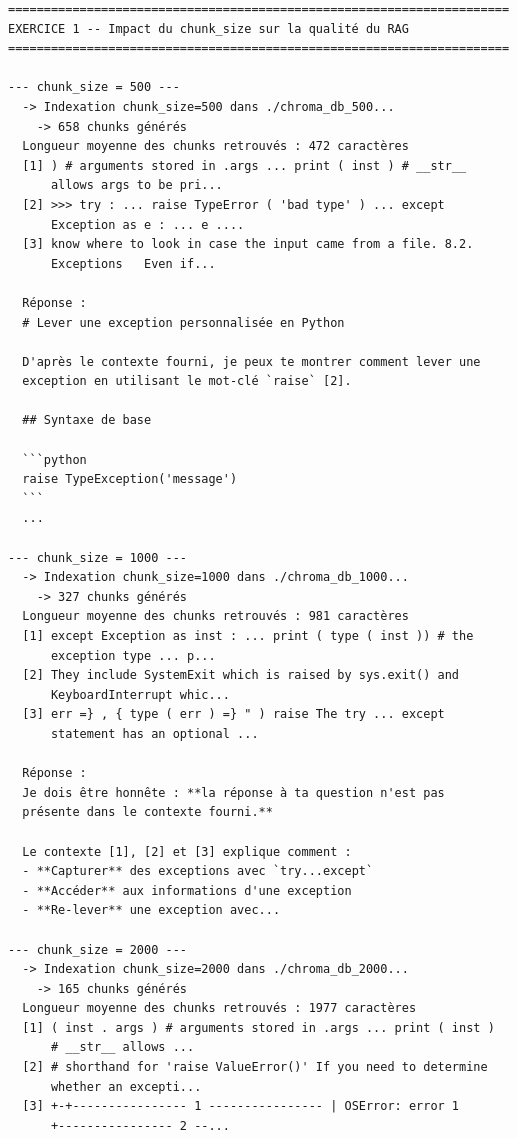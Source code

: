 \documentclass[11pt,a4paper]{article}
\begin{document}
\begin{tcolorbox}[
  colback=white,
  colframe=black!50,
  coltitle=black,
  fonttitle=\footnotesize\bfseries,
  fontupper=\footnotesize,
  title=Sortie de l'exécution,
  breakable,
]
\begin{verbatim}
======================================================================
EXERCICE 1 -- Impact du chunk_size sur la qualité du RAG
======================================================================

--- chunk_size = 500 ---
  -> Indexation chunk_size=500 dans ./chroma_db_500...
    -> 658 chunks générés
  Longueur moyenne des chunks retrouvés : 472 caractères
  [1] ) # arguments stored in .args ... print ( inst ) # __str__
      allows args to be pri...
  [2] >>> try : ... raise TypeError ( 'bad type' ) ... except
      Exception as e : ... e ....
  [3] know where to look in case the input came from a file. 8.2.
      Exceptions   Even if...

  Réponse :
  # Lever une exception personnalisée en Python

  D'après le contexte fourni, je peux te montrer comment lever une
  exception en utilisant le mot-clé `raise` [2].

  ## Syntaxe de base

  ```python
  raise TypeException('message')
  ```
  ...

--- chunk_size = 1000 ---
  -> Indexation chunk_size=1000 dans ./chroma_db_1000...
    -> 327 chunks générés
  Longueur moyenne des chunks retrouvés : 981 caractères
  [1] except Exception as inst : ... print ( type ( inst )) # the
      exception type ... p...
  [2] They include SystemExit which is raised by sys.exit() and
      KeyboardInterrupt whic...
  [3] err =} , { type ( err ) =} " ) raise The try ... except
      statement has an optional ...

  Réponse :
  Je dois être honnête : **la réponse à ta question n'est pas
  présente dans le contexte fourni.**

  Le contexte [1], [2] et [3] explique comment :
  - **Capturer** des exceptions avec `try...except`
  - **Accéder** aux informations d'une exception
  - **Re-lever** une exception avec...

--- chunk_size = 2000 ---
  -> Indexation chunk_size=2000 dans ./chroma_db_2000...
    -> 165 chunks générés
  Longueur moyenne des chunks retrouvés : 1977 caractères
  [1] ( inst . args ) # arguments stored in .args ... print ( inst )
      # __str__ allows ...
  [2] # shorthand for 'raise ValueError()' If you need to determine
      whether an excepti...
  [3] +-+---------------- 1 ---------------- | OSError: error 1
      +---------------- 2 --...


\end{verbatim}
\end{tcolorbox}
\end{document}
